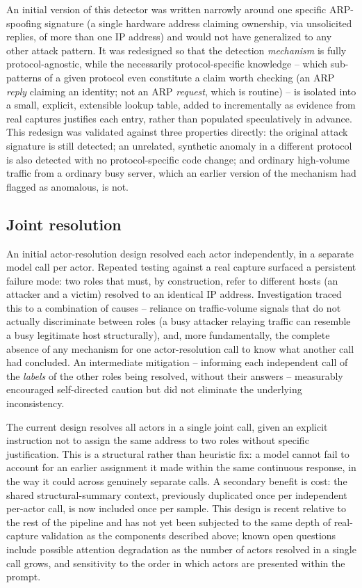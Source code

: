 \documentclass[sigconf,nonacm]{acmart}
\begin{document}
An initial version of this detector was written narrowly around one specific
ARP-spoofing signature (a single hardware address claiming ownership, via
unsolicited replies, of more than one IP address) and would not have
generalized to any other attack pattern. It was redesigned so that the
detection \emph{mechanism} is fully protocol-agnostic, while the necessarily
protocol-specific knowledge -- which sub-patterns of a given protocol even
constitute a claim worth checking (an ARP \emph{reply} claiming an identity;
not an ARP \emph{request}, which is routine) -- is isolated into a small,
explicit, extensible lookup table, added to incrementally as evidence from
real captures justifies each entry, rather than populated speculatively in
advance. This redesign was validated against three properties directly: the
original attack signature is still detected; an unrelated, synthetic anomaly
in a different protocol is also detected with no protocol-specific code
change; and ordinary high-volume traffic from a ordinary busy server, which an
earlier version of the mechanism had flagged as anomalous, is not.

\subsection{Joint resolution}
\label{sec:joint-resolution}

An initial actor-resolution design resolved each actor independently, in a
separate model call per actor. Repeated testing against a real capture
surfaced a persistent failure mode: two roles that must, by construction, refer
to different hosts (an attacker and a victim) resolved to an identical IP
address. Investigation traced this to a combination of causes -- reliance on
traffic-volume signals that do not actually discriminate between roles (a busy
attacker relaying traffic can resemble a busy legitimate host structurally),
and, more fundamentally, the complete absence of any mechanism for one
actor-resolution call to know what another call had concluded. An intermediate
mitigation -- informing each independent call of the \emph{labels} of the other
roles being resolved, without their answers -- measurably encouraged
self-directed caution but did not eliminate the underlying inconsistency.

The current design resolves all actors in a single joint call, given an
explicit instruction not to assign the same address to two roles without
specific justification. This is a structural rather than heuristic fix: a
model cannot fail to account for an earlier assignment it made within the same
continuous response, in the way it could across genuinely separate calls. A
secondary benefit is cost: the shared structural-summary context, previously
duplicated once per independent per-actor call, is now included once per
sample. This design is recent relative to the rest of the pipeline and has not
yet been subjected to the same depth of real-capture validation as the
components described above; known open questions include possible
attention degradation as the number of actors resolved in a single call grows,
and sensitivity to the order in which actors are presented within the prompt.
\end{document}
